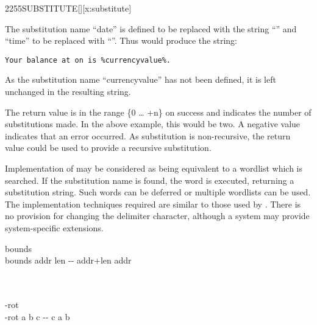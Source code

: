\begin{worddef}{2255}{SUBSTITUTE}[][x:substitute]
\begin{rationale}
		The substitution name ``date'' is defined to be replaced with the string
		``\pdate'' and ``time'' to be replaced with ``\ptime''.  Thus
		 would produce the string:

		\begin{center}
			\texttt{Your balance at \ptime{} on \pdate{} is \%currencyvalue\%.}
		\end{center}

		As the substitution name ``currencyvalue'' has not been defined, it is
		left unchanged in the resulting string.

		The return value  is in the range \{0 {\ldots} +n\} on success
		and indicates the number of substitutions made.  In the above example,
		this would be two.  A negative value indicates that an error occurred.
		As substitution is non-recursive, the return value could be used to
		provide a recursive substitution.

		Implementation of  may be considered as being equivalent
		to a wordlist which is searched.  If the substitution name is found, the
		word is executed, returning a substitution string.
		Such words can be deferred or multiple wordlists can be used.
		The implementation techniques required are similar to those used by
		.
		There is no provision for changing the delimiter character, although a
		system may provide system-specific extensions.
	\end{rationale}

	\begin{implement}

		\word[tools]{[UNDEFINED]} bounds \word[tools]{[IF]} \\
		\tab \word{:} bounds \tab {} addr len -{}- addr+len addr \\
		\tab[2]  \word{+} \\
		\tab \word{;} \\
		\word[tools]{[THEN]}

		\word[tools]{[UNDEFINED]} -rot \word[tools]{[IF]} \\
		\tab \word{:} -rot \tab {} a b c -{}- c a b \\
		\tab[2] \word{ROT}  \\
		\tab \word{;} \\
		\word[tools]{[THEN]}


\end{implement}
\end{worddef}
